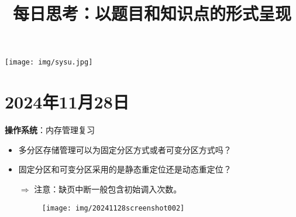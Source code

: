 \documentclass[b5paper, twoside]{article}
\title{每日思考：以题目和知识点的形式呈现}
\date{}
\let\oldincludegraphics\includegraphics
\renewcommand{\includegraphics}[2][]{%
  \begin{tikzpicture}
    \node[opacity=0.9] {\oldincludegraphics[#1]{#2}};
  \end{tikzpicture}%
}
\let\oldtextbf\textbf
\renewcommand{\textbf}[1]{\textcolor{myblue}{\oldtextbf{#1}}}
\begin{document}
\begin{minipage}[t]{\textwidth}
    \vspace{-0.5cm}
    \begin{center}
        \vspace{-1.5cm} %
        \texttt{[image: img/sysu.jpg]}\\
        \vspace{-1.5cm} %
    \end{center}
    \maketitle
    \vspace{-4cm} %
\end{minipage}
\vspace{-0.8cm}

\section{2024年11月28日}
\textbf{操作系统}：内存管理复习
\begin{itemize}
	\item 多分区存储管理可以为固定分区方式或者可变分区方式吗？
	\item 固定分区和可变分区采用的是静态重定位还是动态重定位？
	\item[$\Rightarrow$] 注意：缺页中断一般包含初始调入次数。
	\begin{figure}[th]
		\centering
		\texttt{[image: img/20241128screenshot002]}
		\label{fig:20241128screenshot002}
	\end{figure}
\end{itemize}


\tableofcontents
\label{toc}
\end{document}
